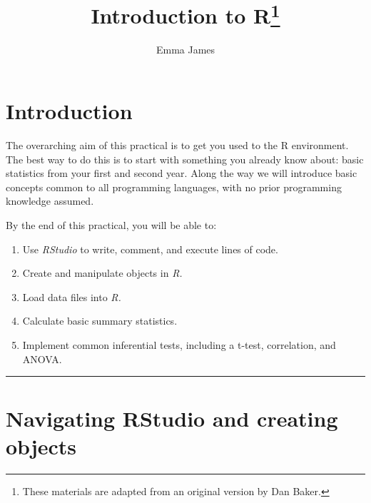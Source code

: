 \documentclass[
  a4paper,
  DIV=11,
  numbers=noendperiod]{scrreprt}
\title{Introduction to R\thanks{These materials are adapted from an
original version by Dan Baker.}}
\author{Emma James}
\date{}
\providecommand{\tightlist}{%
  \setlength{\itemsep}{0pt}\setlength{\parskip}{0pt}}
\begin{document}
\maketitle


\chapter{Introduction}\label{introduction}

The overarching aim of this practical is to get you used to the R
environment. The best way to do this is to start with something you
already know about: basic statistics from your first and second year.
Along the way we will introduce basic concepts common to all programming
languages, with no prior programming knowledge assumed.

\begin{tcolorbox}[enhanced jigsaw, colbacktitle=quarto-callout-note-color!10!white, leftrule=.75mm, breakable, colframe=quarto-callout-note-color-frame, opacityback=0, titlerule=0mm, rightrule=.15mm, opacitybacktitle=0.6, colback=white, coltitle=black, toprule=.15mm, bottomtitle=1mm, bottomrule=.15mm, toptitle=1mm, title={Learning objectives}, arc=.35mm, left=2mm]

By the end of this practical, you will be able to:

\begin{enumerate}
\def\labelenumi{\arabic{enumi}.}
\tightlist
\item
  Use \emph{RStudio} to write, comment, and execute lines of code.
\item
  Create and manipulate objects in \emph{R.}
\item
  Load data files into \emph{R.}
\item
  Calculate basic summary statistics.
\item
  Implement common inferential tests, including a t-test, correlation,
  and ANOVA.
\end{enumerate}

\end{tcolorbox}

\begin{center}\rule{0.5\linewidth}{0.5pt}\end{center}

\chapter{Navigating RStudio and creating
objects}\label{navigating-rstudio-and-creating-objects}
\end{document}
